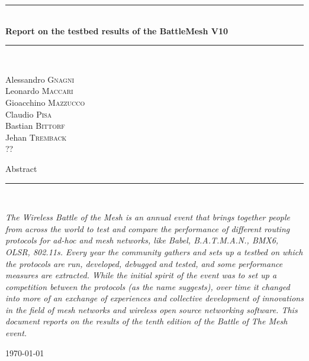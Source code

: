\documentclass[10pt,onecolumn]{paper}
\newcommand{\HRule}{\rule{\linewidth}{0.5mm}}
\begin{document}
\begin{titlepage}
\begin{center}

\HRule \\[0.4cm]
{ \huge \bfseries Report on the testbed results of the BattleMesh V10 \\[0.4cm] }

\HRule \\[1.5cm]

\begin{minipage}{0.4\textwidth}
\begin{flushleft} \large
Alessandro \textsc{Gnagni}\\
Leonardo \textsc{Maccari}\\
Gioacchino \textsc{Mazzucco}\\
Claudio \textsc{Pisa}\\
Bastian \textsc{Bittorf}\\
Jehan \textsc{Tremback}\\
 \textsc{??}\\
\end{flushleft}
\end{minipage}
\begin{minipage}{0.4\textwidth}
\end{minipage}

\vfill
{\large Abstract}
\HRule \\[0.4cm]
\begin{flushleft}
\emph{The Wireless Battle of the Mesh is an annual event that brings together
people from across the world to test and compare the performance of different routing
protocols for ad-hoc and mesh networks, like Babel, B.A.T.M.A.N., BMX6, OLSR,
802.11s. Every year the community gathers and sets up a testbed on which the
protocols are run, developed, debugged and tested, and some performance
measures are extracted. While the initial spirit of the event was to set up a
competition between the protocols (as the name suggests), over time it changed
into more of an exchange of experiences and collective development of
innovations in the field of mesh networks and wireless open source
networking software. This document reports on the results of the tenth edition
of the Battle of The Mesh event.}
\end{flushleft}
\vskip2cm

\vfill

{\large \today}

\end{center}
\end{titlepage}
\end{document}
